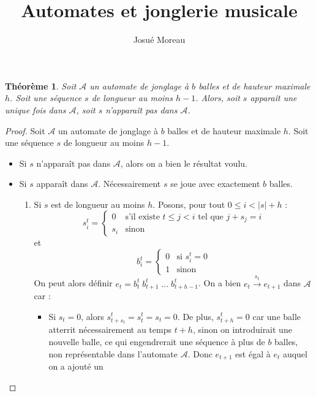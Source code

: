 \documentclass[a4paper, 11pt]{article}
\title{Automates et jonglerie musicale}
\author{Josué Moreau}
\theoremstyle{plain}
\newtheorem{thm}{Théorème}[]
\begin{document}
\maketitle

\begin{thm}
  Soit $\mathcal{A}$ un automate de jonglage à $b$ balles et de hauteur maximale
  $h$. Soit une séquence $s$ de longueur au moins $h - 1$. Alors, soit $s$
  apparaît une unique fois dans $\mathcal{A}$, soit $s$ n'apparaît pas dans
  $\mathcal{A}$.
\end{thm}

\begin{proof}
  Soit $\mathcal{A}$ un automate de jonglage à $b$ balles et de hauteur maximale
  $h$. Soit une séquence $s$ de longueur au moins $h - 1$.
  \begin{itemize}
  \item Si $s$ n'apparaît pas dans $\mathcal{A}$, alors on a bien le résultat
    voulu.
  \item Si $s$ apparaît dans $\mathcal{A}$. Nécessairement $s$ se joue avec
    exactement $b$ balles.
    \begin{enumerate}
    \item Si $s$ est de longueur au moins $h$. Posons, pour tout
      $0 \leq i < |s| + h$ :
      \[
        s_i^t =
        \left\{
          \begin{array}{ll}
            0 & \text{s'il existe } t \leq j < i \text{ tel que } j + s_j = i\\
            s_i & \text{sinon}
          \end{array}
        \right.
      \]
      et
      \[
        b_i^t =
        \left\{
          \begin{array}{ll}
            0 & \text{si } s_i^t = 0\\
            1 & \text{sinon}
          \end{array}
        \right.
      \]
      On peut alors définir $e_t = b_t^t\;b_{t + 1}^t\; ... \;b_{t + h - 1}^t$.
      On a bien $e_t \xrightarrow{s_t} e_{t + 1}$ dans $\mathcal{A}$ car :
      \begin{itemize}
      \item Si $s_t = 0$, alors $s_{t + s_t}^{t} = s_t^t = s_t = 0$. De plus,
        $s_{t + h}^t = 0$ car une balle atterrit nécessairement au temps
        $t + h$, sinon on introduirait une nouvelle balle, ce qui engendrerait
        une séquence à plus de $b$ balles, non représentable dans l'automate
        $\mathcal{A}$. Donc $e_{t + 1}$ est égal à $e_t$ auquel on a ajouté un

\end{itemize}
\end{enumerate}
\end{itemize}
\end{proof}
\end{document}
